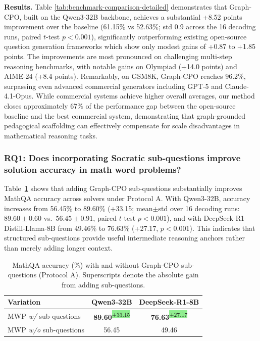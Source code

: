 \documentclass[sigconf, anonymous, review, screen]{acmart}
\newcommand{\improve}[1]{\textsuperscript{\colorbox{lightgreen}{\textcolor{textgreen}{\tiny +#1}}}}
\begin{document}
\textbf{Results.} Table \ref{tab:benchmark-comparison-detailed} demonstrates that Graph-CPO, built on the Qwen3-32B backbone, achieves a substantial +8.52 points improvement over the baseline (61.15\% vs 52.63\%; std 0.9 across the 16 decoding runs, paired $t$-test $p<0.001$), significantly outperforming existing open-source question generation frameworks which show only modest gains of +0.87 to +1.85 points. The improvements are most pronounced on challenging multi-step reasoning benchmarks, with notable gains on Olympiad (+14.0 points) and AIME-24 (+8.4 points). Remarkably, on GSM8K, Graph-CPO reaches 96.2\%, surpassing even advanced commercial generators including GPT-5 and Claude-4.1-Opus. While commercial systems achieve higher overall averages, our method closes approximately 67\% of the performance gap between the open-source baseline and the best commercial system, demonstrating that graph-grounded pedagogical scaffolding can effectively compensate for scale disadvantages in mathematical reasoning tasks.



\subsubsection{\textbf{RQ1: Does incorporating Socratic sub-questions improve solution accuracy in math word problems?}}

Table~\ref{tab:socratic-comparison} shows that adding Graph-CPO sub-questions substantially improves MathQA accuracy across solvers under Protocol A. With Qwen3-32B, accuracy increases from 56.45\% to 89.60\% (+33.15; mean$\pm$std over 16 decoding runs: $89.60\pm0.60$ vs.\ $56.45\pm0.91$, paired $t$-test $p<0.001$), and with DeepSeek-R1-Distill-Llama-8B from 49.46\% to 76.63\% (+27.17, $p<0.001$). This indicates that structured sub-questions provide useful intermediate reasoning anchors rather than merely adding longer context.

\begin{table}[t]
\centering
\footnotesize
\caption{MathQA accuracy (\%) with and without Graph-CPO sub-questions (Protocol A). Superscripts denote the absolute gain from adding sub-questions.}
\label{tab:socratic-comparison}

\begin{tabular}{lcc}
\toprule
\textbf{Variation} & \textbf{Qwen3-32B} & \textbf{DeepSeek-R1-8B} \\
\midrule
MWP \textit{w/} sub-questions & \textbf{89.60}\improve{33.15} & \textbf{76.63}\improve{27.17} \\
MWP \textit{w/o} sub-questions & 56.45 & 49.46 \\
\bottomrule
\end{tabular}

\end{table}
\end{document}
